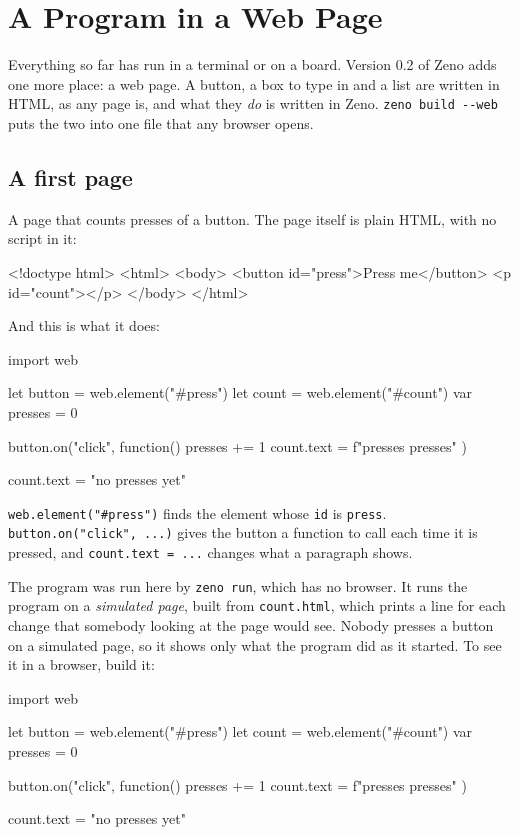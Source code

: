 \chapter{A Program in a Web Page}\label{ch-web}

Everything so far has run in a terminal or on a board. Version 0.2 of
Zeno adds one more place: a web page. A button, a box to type in and a
list are written in HTML, as any page is, and what they \emph{do} is
written in Zeno. \verb|zeno build --web| puts the two into one file
that any browser opens.

\section{A first page}

A page that counts presses of a button. The page itself is plain HTML,
with no script in it:

\begin{zeno}[file=count.html, dir=count, run=no]
<!doctype html>
<html>
<body>
<button id="press">Press me</button>
<p id="count"></p>
</body>
</html>
\end{zeno}

And this is what it does:

\begin{zeno}[file=count.zeno, dir=count]
import web

let button = web.element("#press")
let count = web.element("#count")
var presses = 0

button.on("click", function() {
    presses += 1
    count.text = f"{presses} presses"
})

count.text = "no presses yet"
\end{zeno}

\verb|web.element("#press")| finds the element whose \verb|id| is
\verb|press|. \verb|button.on("click", ...)| gives the button a
function to call each time it is pressed, and \verb|count.text = ...|
changes what a paragraph shows.

The program was run here by \verb|zeno run|, which has no browser. It
runs the program on a \emph{simulated page}, built from
\verb|count.html|, which prints a line for each change that somebody
looking at the page would see. Nobody presses a button on a simulated
page, so it shows only what the program did as it started. To see it in a browser, build it:

\begin{zeno}[file=count.zeno, dir=count, show=no, cmd=zeno build --web {file}]
import web

let button = web.element("#press")
let count = web.element("#count")
var presses = 0

button.on("click", function() {
    presses += 1
    count.text = f"{presses} presses"
})

count.text = "no presses yet"
\end{zeno}

